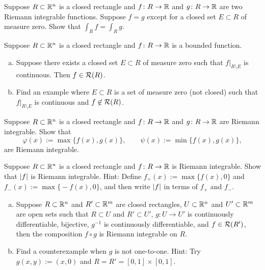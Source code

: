 \begin{exercise}
Suppose $R \subset {\mathbb{R}}^n$ is a closed rectangle and
$f \colon R \to {\mathbb{R}}$ and
$g \colon R \to {\mathbb{R}}$ are two Riemann integrable functions.  Suppose $f = g$
except for a closed set $E \subset R$ of measure zero.  Show that $\int_R f = \int_R g$.
\end{exercise}

\begin{samepage}
\begin{exercise}
Suppose $R \subset {\mathbb{R}}^n$ is a closed rectangle and
$f \colon R \to {\mathbb{R}}$ is a bounded function.
\begin{enumerate}[a)]
\item
Suppose there exists a closed set $E \subset R$ of measure zero such that
$f|_{R\setminus E}$ is continuous.  Then $f \in {\mathcal{R}}(R)$.
\item
Find an example where $E \subset R$ is a set of measure zero
(not closed) such that
$f|_{R\setminus E}$ is continuous and $f \not\in {\mathcal{R}}(R)$.
\end{enumerate}
\end{exercise}
\end{samepage}

\begin{exercise}
Suppose $R \subset {\mathbb{R}}^n$ is a closed rectangle
and $f \colon R \to {\mathbb{R}}$ and $g \colon R \to {\mathbb{R}}$ 
are Riemann integrable.
Show that
\begin{equation*}
\varphi(x) := \max \bigl\{ f(x) , g(x) \bigr\} ,
\qquad
\psi(x) := \min \bigl\{ f(x) , g(x) \bigr\} ,
\end{equation*}
are Riemann integrable.
\end{exercise}

\begin{exercise}
Suppose $R \subset {\mathbb{R}}^n$ is a closed rectangle
and $f \colon R \to {\mathbb{R}}$ is Riemann integrable.
Show that $\lvert {f} \rvert$ is Riemann integrable.
Hint: Define
$f_+(x) := \max \bigl\{ f(x) , 0 \bigr\}$ and
$f_-(x) := \max \bigl\{ -f(x) , 0 \bigr\}$, and then write $\lvert {f} \rvert$
in terms of $f_+$ and $f_-$.
\end{exercise}

\begin{exercise}
\leavevmode
\begin{enumerate}[a)]
\item
Suppose $R \subset {\mathbb{R}}^n$ and
$R' \subset {\mathbb{R}}^m$ are closed rectangles,
$U \subset {\mathbb{R}}^n$ and $U' \subset {\mathbb{R}}^m$ are open sets such that
$R \subset U$ and $R' \subset U'$,
$g \colon U \to U'$ is continuously differentiable, bijective,
$g^{-1}$ is continuously differentiable, and
$f \in {\mathcal{R}}(R')$, 
then the composition $f \circ g$ is Riemann integrable on $R$.
\item
Find a counterexample when $g$ is not one-to-one.
Hint: Try $g(x,y) := (x,0)$ and $R=R'=[0,1] \times [0,1]$.
\end{enumerate}
\end{exercise}

